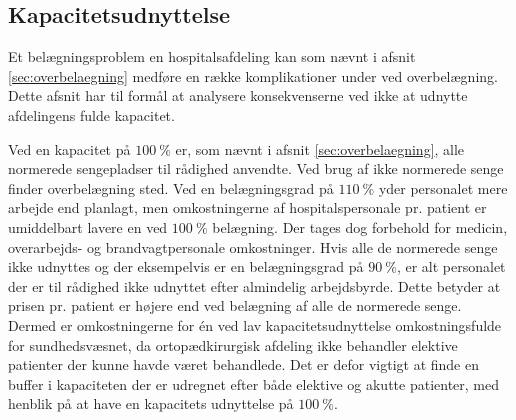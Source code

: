 \subsection{Kapacitetsudnyttelse}

Et belægningsproblem en hospitalsafdeling kan som nævnt i afsnit \ref{sec:overbelaegning} medføre en række komplikationer under ved overbelægning. Dette afsnit har til formål at analysere konsekvenserne ved ikke at udnytte afdelingens fulde kapacitet.

Ved en kapacitet på $100~\%$ er, som nævnt i afsnit \ref{sec:overbelaegning}, alle normerede sengepladser til rådighed anvendte. Ved brug af ikke normerede senge finder overbelægning sted. Ved en belægningsgrad på $110~\%$ yder personalet mere arbejde end planlagt, men omkostningerne af hospitalspersonale pr. patient er umiddelbart lavere en ved $100~\%$ belægning. Der tages dog forbehold for medicin, overarbejds- og brandvagtpersonale omkostninger.
Hvis alle de normerede senge ikke udnyttes og der eksempelvis er en belægningsgrad på $90~\%$, er alt personalet der er til rådighed ikke udnyttet efter almindelig arbejdsbyrde. Dette betyder at prisen pr. patient er højere end ved belægning af alle de normerede senge. \cite{Pauly1986} Dermed er omkostningerne for én ved lav kapacitetsudnyttelse omkostningsfulde for sundhedsvæsnet, da ortopædkirurgisk afdeling ikke behandler elektive patienter der kunne havde været behandlede. Det er defor vigtigt at finde en buffer i kapaciteten der er udregnet efter både elektive og akutte patienter, med henblik på at have en kapacitets udnyttelse på $100~\%$. 